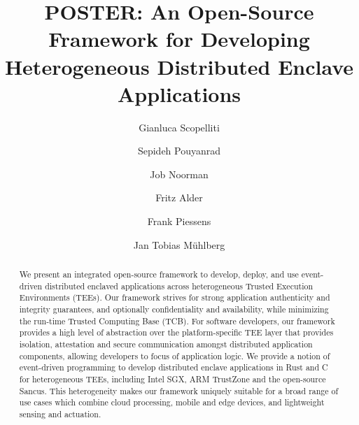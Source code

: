 \documentclass[sigconf]{acmart}
\begin{document}
\fancyhead{}

\title{POSTER: An Open-Source Framework for Developing Heterogeneous
  Distributed Enclave Applications}

\author{Gianluca Scopelliti}
\author{Sepideh Pouyanrad}
\author{Job Noorman}
\author{Fritz Alder}
\author{Frank Piessens}
\author{Jan Tobias M\"{u}hlberg}

\begin{abstract}
%
We present an integrated open-source framework to develop, deploy, and use
event-driven distributed enclaved applications across heterogeneous Trusted
Execution Environments (TEEs). Our framework strives for strong application
authenticity and integrity guarantees, and optionally confidentiality and
availability, while minimizing the run-time Trusted Computing Base (TCB). For
software developers, our framework provides a high level of abstraction
over the platform-specific TEE layer that provides isolation, attestation
and secure communication amongst distributed application components,
allowing developers to focus of application logic. We provide a notion of
event-driven programming to develop distributed enclave applications in
Rust and C for heterogeneous TEEs, including Intel SGX, ARM TrustZone and
the open-source Sancus. This heterogeneity makes our framework uniquely
suitable for a broad range of use cases which combine cloud processing,
mobile and edge devices, and lightweight sensing and actuation.
%
\end{abstract}



\end{document}
